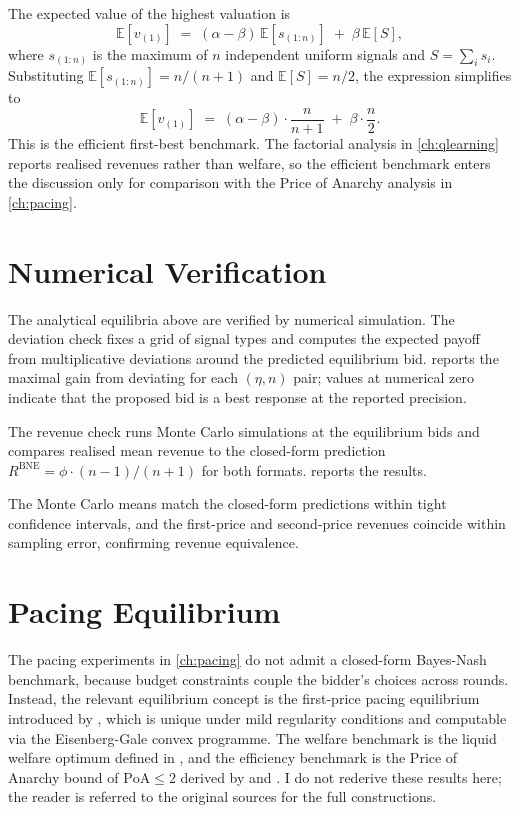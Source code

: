 The expected value of the highest valuation is
\[
\mathbb{E}[v_{(1)}] \;=\; (\alpha - \beta) \, \mathbb{E}[s_{(1:n)}] \;+\; \beta \, \mathbb{E}[S],
\]
where $s_{(1:n)}$ is the maximum of $n$ independent uniform signals and $S = \sum_i s_i$. Substituting $\mathbb{E}[s_{(1:n)}] = n / (n + 1)$ and $\mathbb{E}[S] = n / 2$, the expression simplifies to
\[
\mathbb{E}[v_{(1)}] \;=\; (\alpha - \beta) \cdot \frac{n}{n + 1} \;+\; \beta \cdot \frac{n}{2}.
\]
This is the efficient first-best benchmark. The factorial analysis in \cref{ch:qlearning} reports realised revenues rather than welfare, so the efficient benchmark enters the discussion only for comparison with the Price of Anarchy analysis in \cref{ch:pacing}.

\section{Numerical Verification}
\label{sec:eq_numerical}

The analytical equilibria above are verified by numerical simulation. The deviation check fixes a grid of signal types and computes the expected payoff from multiplicative deviations around the predicted equilibrium bid.  reports the maximal gain from deviating for each $(\eta, n)$ pair; values at numerical zero indicate that the proposed bid is a best response at the reported precision.



The revenue check runs Monte Carlo simulations at the equilibrium bids and compares realised mean revenue to the closed-form prediction $R^{\mathrm{BNE}} = \phi \cdot (n - 1)/(n + 1)$ for both formats.  reports the results.



The Monte Carlo means match the closed-form predictions within tight confidence intervals, and the first-price and second-price revenues coincide within sampling error, confirming revenue equivalence.

\section{Pacing Equilibrium}
\label{sec:eq_pacing}

The pacing experiments in \cref{ch:pacing} do not admit a closed-form Bayes-Nash benchmark, because budget constraints couple the bidder's choices across rounds. Instead, the relevant equilibrium concept is the first-price pacing equilibrium introduced by \citet{Conitzer2022FPPE}, which is unique under mild regularity conditions and computable via the Eisenberg-Gale convex programme. The welfare benchmark is the liquid welfare optimum defined in , and the efficiency benchmark is the Price of Anarchy bound of $\mathrm{PoA} \leq 2$ derived by \citet{Aggarwal2019} and \citet{Gaitonde2023}. I do not rederive these results here; the reader is referred to the original sources for the full constructions.
